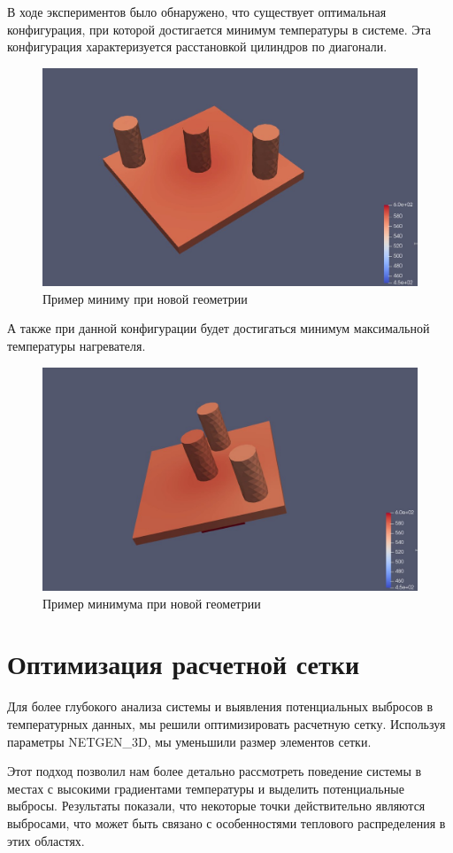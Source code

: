 \documentclass[a4paper,12pt]{article}
\theoremstyle{plain} %
\theoremstyle{definition} %
\theoremstyle{remark} %
\begin{document}
В ходе экспериментов было обнаружено, что существует оптимальная конфигурация, при которой достигается минимум температуры в системе. Эта конфигурация характеризуется расстановкой цилиндров по диагонали.

\begin{figure}[h]
	\begin{center}
		\includegraphics[width=0.4\linewidth]{21.4.jpg}
		\caption{Пример миниму при новой геометрии} %
	\end{center}
\end{figure}

А также при данной конфигурации будет достигаться минимум максимальной температуры нагревателя.

\begin{figure}[h]
	\begin{center}
		\includegraphics[width=0.4\linewidth]{21.5.jpg}
		\caption{Пример минимума при новой геометрии} %
	\end{center}
\end{figure}

\section{Оптимизация расчетной сетки}

Для более глубокого анализа системы и выявления потенциальных выбросов в температурных данных, мы решили оптимизировать расчетную сетку. Используя параметры NETGEN_3D, мы уменьшили размер элементов сетки.

Этот подход позволил нам более детально рассмотреть поведение системы в местах с высокими градиентами температуры и выделить потенциальные выбросы. Результаты показали, что некоторые точки действительно являются выбросами, что может быть связано с особенностями теплового распределения в этих областях.
\end{document}

